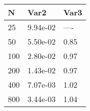 \begin{tabular}{lll}
    N   & Var2     & Var3 \\
    \hline
    25  & 9.94e-02 & ---- \\
    50  & 5.50e-02 & 0.85 \\
    100 & 2.80e-02 & 0.97 \\
    200 & 1.43e-02 & 0.97 \\
    400 & 7.07e-03 & 1.02 \\
    800 & 3.44e-03 & 1.04 \\
    \hline
\end{tabular}